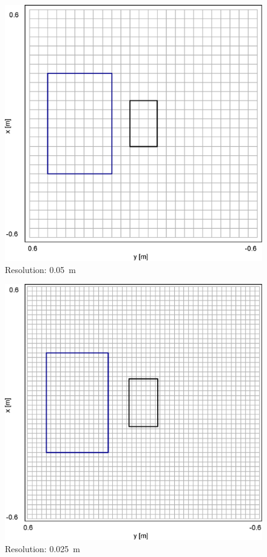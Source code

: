 \documentclass[main]{subfiles}
\begin{document}
\begin{figure}[H]
  \centering
  \includegraphics[width = 100 mm]{graph/grid/0.05.eps}
  \caption{Resolution: \SI{0.05}{m}}
\end{figure}
\begin{figure}[H]
  \centering
  \includegraphics[width = 100 mm]{graph/grid/0.025.eps}
  \caption{Resolution: \SI{0.025}{m}}
\end{figure}
\end{document}
